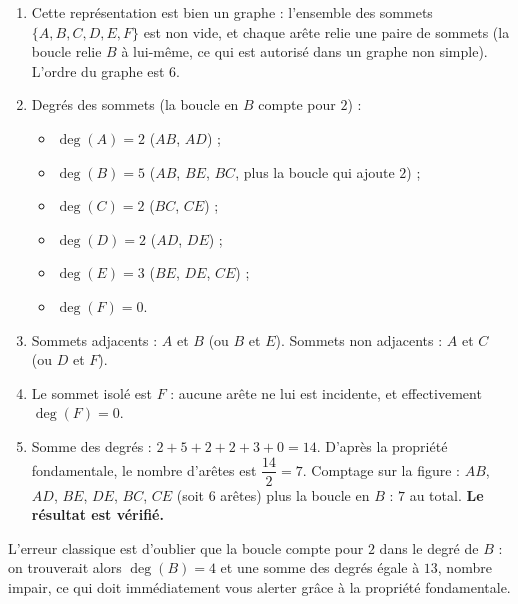 \documentclass[11pt]{article}
\newcommand{\cle}[1]{{\popxbold\color{popdark}#1}}
\begin{document}
\begin{corrige}
\begin{enumerate}
\item Cette représentation est bien un graphe : l'ensemble des sommets $\{A, B, C, D, E, F\}$ est non vide, et chaque arête relie une paire de sommets (la boucle relie $B$ à lui-même, ce qui est autorisé dans un graphe non simple). L'\cle{ordre} du graphe est $6$.
\item Degrés des sommets (la boucle en $B$ compte pour $2$) :
\begin{itemize}
\item $\deg(A) = 2$ ($AB$, $AD$) ;
\item $\deg(B) = 5$ ($AB$, $BE$, $BC$, plus la boucle qui ajoute $2$) ;
\item $\deg(C) = 2$ ($BC$, $CE$) ;
\item $\deg(D) = 2$ ($AD$, $DE$) ;
\item $\deg(E) = 3$ ($BE$, $DE$, $CE$) ;
\item $\deg(F) = 0$.
\end{itemize}
\item Sommets adjacents : $A$ et $B$ (ou $B$ et $E$). Sommets non adjacents : $A$ et $C$ (ou $D$ et $F$).
\item Le sommet \cle{isolé} est $F$ : aucune arête ne lui est incidente, et effectivement $\deg(F) = 0$.
\item Somme des degrés : $2 + 5 + 2 + 2 + 3 + 0 = 14$. D'après la propriété fondamentale, le nombre d'arêtes est $\dfrac{14}{2} = 7$. Comptage sur la figure : $AB$, $AD$, $BE$, $DE$, $BC$, $CE$ (soit $6$ arêtes) plus la boucle en $B$ : $7$ au total. \textbf{Le résultat est vérifié.}
\end{enumerate}
\end{corrige}

\begin{attention}
L'erreur classique est d'oublier que la boucle compte pour $2$ dans le degré de $B$ : on trouverait alors $\deg(B) = 4$ et une somme des degrés égale à $13$, nombre impair, ce qui doit immédiatement vous alerter grâce à la propriété fondamentale.
\end{attention}
\end{document}
